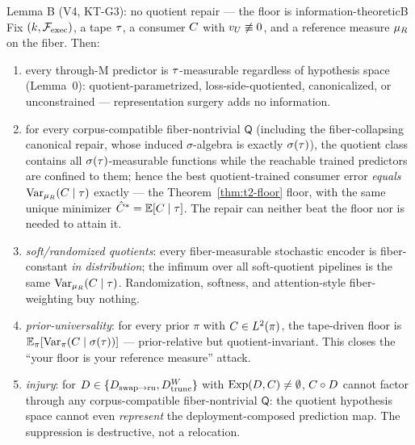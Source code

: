 
\begin{preregthm}{Lemma B (V4, KT-G3): no quotient repair --- the floor is
information-theoretic}{B}
\label{lem:v4-b}
Fix $(k, \Fexec)$, a tape $\tape$, a consumer $\Ccons$ with $\vU \not\equiv
0$, and a reference measure $\muR$ on the fiber. Then:
\begin{enumerate}
\item[(B.1)] every through-M predictor is $\tape$-measurable regardless of
hypothesis space (Lemma~0): quotient-parametrized, loss-side-quotiented,
canonicalized, or unconstrained --- representation surgery adds no
information.
\item[(B.2)] for every corpus-compatible fiber-nontrivial $\mathsf{Q}$
(including the fiber-collapsing canonical repair, whose induced
$\sigma$-algebra is exactly $\sigma(\tape)$), the quotient class contains
all
$\sigma(\tape)$-measurable functions while the reachable trained predictors
are confined to them; hence the best quotient-trained consumer error
\emph{equals} $\mathrm{Var}_{\muR}(\Ccons \mid \tape)$ exactly --- the
Theorem~\ref{thm:t2-floor} floor, with the same unique minimizer
$\hat{\Ccons}^{*} = \mathbb{E}[\Ccons \mid \tape]$. The repair can neither
beat the floor nor is needed to attain it.
\item[(B.3)] \emph{soft/randomized quotients}: every fiber-measurable
stochastic encoder is fiber-constant \emph{in distribution}; the infimum
over all soft-quotient pipelines is the same $\mathrm{Var}_{\muR}(\Ccons
\mid \tape)$. Randomization, softness, and attention-style fiber-weighting
buy nothing.
\item[(B.4)] \emph{prior-universality}: for every prior $\pi$ with $\Ccons
\in L^2(\pi)$, the tape-driven floor is $\mathbb{E}_\pi[\mathrm{Var}_\pi(\Ccons
\mid \sigma(\tape))]$ --- prior-relative but quotient-invariant. This closes
the ``your floor is your reference measure'' attack.
\item[(B.5)] \emph{injury}: for $D \in \{\Dswapru, \Dtrunc[W]\}$ with
$\Exp(D, \Ccons) \ne \emptyset$, $\Ccons \circ D$ cannot factor through any
corpus-compatible fiber-nontrivial $\mathsf{Q}$: the quotient hypothesis
space cannot even \emph{represent} the deployment-composed prediction map.
The suppression is destructive, not a relocation.
\end{enumerate}
\end{preregthm}

